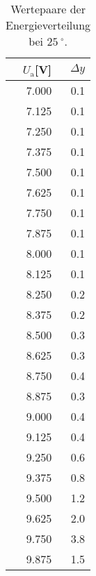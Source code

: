 
\begin{table}[!h]
\begin{center}
\begin{tabular}{|r|r|}
\hline
$U_\mathrm{a}$[V] & $\Delta y$ \\
\hline
\hline

7.000 	& 0.1 \\
7.125 	& 0.1 \\
7.250 	& 0.1 \\
7.375 	& 0.1 \\
7.500 	& 0.1 \\
7.625 	& 0.1 \\
7.750 	& 0.1 \\
7.875 	& 0.1 \\
8.000 	& 0.1 \\
8.125 	& 0.1 \\
8.250 	& 0.2 \\
8.375 	& 0.2 \\
8.500 	& 0.3 \\
8.625 	& 0.3 \\
8.750 	& 0.4 \\
8.875 	& 0.3 \\
9.000 	& 0.4 \\
9.125   & 0.4 \\
9.250 	& 0.6 \\
9.375 	& 0.8 \\
9.500 	& 1.2 \\
9.625 	& 2.0 \\
9.750 	& 3.8 \\
9.875 	& 1.5 \\

\hline
\end{tabular}
\caption[]{Wertepaare der Energieverteilung bei $\SI{25}{^\circ}$.}
\label{tab:a1}
\end{center}
\end{table}
